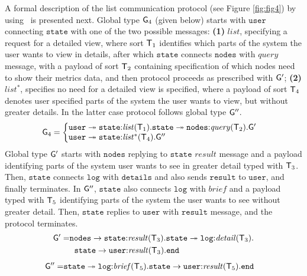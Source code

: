 \noindent
A formal description of the list communication protocol (see Figure \ref{fig:fig4}) by using~\cite{HuY17} is presented next. Global type ${\sf G}_4$ (given below) starts with $\mathtt{user}$ connecting $\mathtt{state}$ with one of the two possible messages: 
\textbf{(1)} $\mathit{list}$, specifying a request for a detailed view, where sort ${\mathsf T}_1$ identifies which parts of the system the user wants to view in details, after which $\mathtt{state}$ connects $\mathtt{nodes}$ with $\mathit{query}$ message, with a payload of sort ${\mathsf T}_2$  containing specification of which nodes need to show their metrics data, and then protocol proceeds as prescribed with ${\sf G}'$; 
\textbf{(2)} $\mathit{list^*}$, specifies no need for a detailed view is specified, where a payload of sort ${\mathsf T}_4$ denotes user specified parts of the system the user wants to view, but without greater details. In the latter case protocol follows global type ${\sf G}''$.
\begin{align*}
\G_4 &= 
\left\{
\begin{array}{@{}l@{}}  
\mathtt{user} \twoheadrightarrow \mathtt{state}{:}\mathit{list}(\T_1).\mathtt{state}\twoheadrightarrow\mathtt{nodes}{:}\mathit{query}(\T_2). \G' \\
\mathtt{user} \twoheadrightarrow \mathtt{state}{:}\mathit{list^*}(\T_4).\G''
\end{array} \right.
\end{align*}
Global type ${\sf G}'$ starts with $\mathtt{nodes}$ replying to $\mathtt{state}$ $\mathit{result}$ message and a payload identifying parts of the system user wants to see in greater detail typed with ${\mathsf T}_3$. Then, $\mathtt{state}$ connects $\mathtt{log}$ with $\mathtt{details}$ and also sends $\mathtt{result}$ to $\mathtt{user}$, and finally terminates. 
In ${\sf G}''$, $\mathtt{state}$ also connects $\mathtt{log}$ with $\mathit{brief}$ and a payload typed with ${\mathsf T}_5$ identifying parts of the system the user wants to see without greater detail. Then, $\mathtt{state}$ replies to $\mathtt{user}$ with $\mathtt{result}$ message, and the protocol terminates.
\begin{align*}
\begin{split}
	{\sf G}' =  & 
	\mathtt{nodes}\to\mathtt{state}{:}\mathit{result}({\mathsf T}_3).\mathtt{state}\twoheadrightarrow \mathtt{log}{:}\mathit{detail}({\mathsf T}_3). \\
	& \hspace{2mm}
	\mathtt{state}\to\mathtt{user}{:}\mathit{result}({\mathsf T}_3).\mathtt{end}
\end{split}
\end{align*}
\begin{align*}
	{\sf G}'' = &
	\mathtt{state}\twoheadrightarrow \mathtt{log}{:}\mathit{brief}({\mathsf T}_5).\mathtt{state}\to\mathtt{user}{:}\mathit{result}({\mathsf T}_5).\mathtt{end}
\end{align*}

